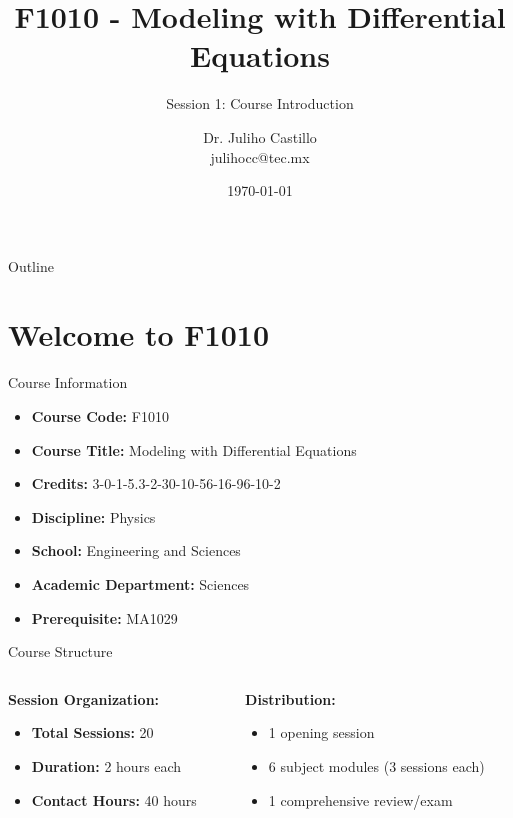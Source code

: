 \documentclass[10pt,aspectratio=169]{beamer}
\title{F1010 - Modeling with Differential Equations}
\subtitle{Session 1: Course Introduction}
\author{Dr. Juliho Castillo\\julihocc@tec.mx}
\institute{School of Engineering and Sciences\\Academic Department of Sciences}
\date{\today}
\begin{document}
\maketitle

\begin{frame}{Outline}
    \tableofcontents
\end{frame}

\section{Welcome to F1010}

\begin{frame}{Course Information}
    \begin{itemize}
        \item \textbf{Course Code:} F1010
        \item \textbf{Course Title:} Modeling with Differential Equations
        \item \textbf{Credits:} 3-0-1-5.3-2-30-10-56-16-96-10-2
        \item \textbf{Discipline:} Physics
        \item \textbf{School:} Engineering and Sciences
        \item \textbf{Academic Department:} Sciences
        \item \textbf{Prerequisite:} MA1029
    \end{itemize}
\end{frame}

\begin{frame}{Course Structure}
    \begin{columns}
        \begin{column}{0.5\textwidth}
            \textbf{Session Organization:}
            \begin{itemize}
                \item \textbf{Total Sessions:} 20
                \item \textbf{Duration:} 2 hours each
                \item \textbf{Contact Hours:} 40 hours
            \end{itemize}
        \end{column}
        \begin{column}{0.5\textwidth}
            \textbf{Distribution:}
            \begin{itemize}
                \item 1 opening session
                \item 6 subject modules (3 sessions each)
                \item 1 comprehensive review/exam
            \end{itemize}
        \end{column}
    \end{columns}
\end{frame}
\end{document}
